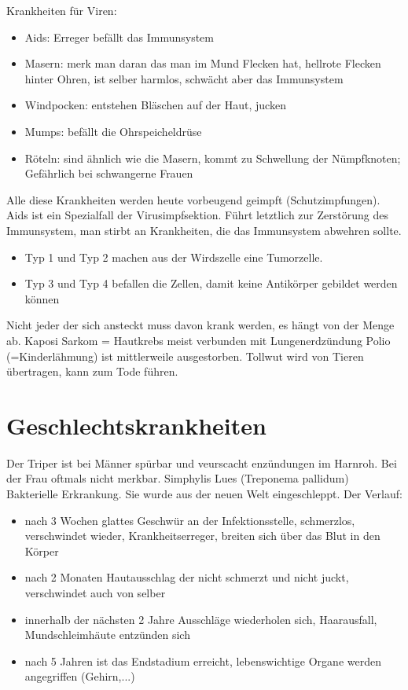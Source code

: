 \documentclass[a4paper]{article}
\begin{document}
Krankheiten für Viren:

\begin{itemize}
\item Aids: Erreger befällt das Immunsystem
\item Masern: merk man daran das man im Mund Flecken hat, hellrote Flecken hinter Ohren, ist selber harmlos, schwächt aber das Immunsystem
\item Windpocken: entstehen Bläschen auf der Haut, jucken
\item Mumps: befällt die Ohrspeicheldrüse
\item Röteln: sind ähnlich wie die Masern, kommt zu Schwellung der Nümpfknoten; Gefährlich bei schwangerne Frauen

\end{itemize}

Alle diese Krankheiten werden heute vorbeugend geimpft (Schutzimpfungen). Aids ist ein Spezialfall der Virusimpfsektion. Führt letztlich zur Zerstörung des Immunsystem, man stirbt an Krankheiten, die das Immunsystem abwehren sollte.

\begin{itemize}
\item Typ 1 und Typ 2 machen aus der Wirdszelle eine Tumorzelle.
\item Typ 3 und Typ 4 befallen die Zellen, damit keine Antikörper gebildet werden können
\end{itemize}

Nicht jeder der sich ansteckt muss davon krank werden, es hängt von der Menge ab. Kaposi Sarkom = Hautkrebs meist verbunden mit Lungenerdzündung Polio (=Kinderlähmung) ist mittlerweile ausgestorben. Tollwut wird von Tieren übertragen, kann zum Tode führen.

\section{Geschlechtskrankheiten}
Der Triper ist bei Männer spürbar und veurscacht enzündungen im Harnroh. Bei der Frau oftmals nicht merkbar.
Simphylis Lues (Treponema pallidum) Bakterielle Erkrankung. Sie wurde aus der neuen Welt eingeschleppt. 
\nextline
Der Verlauf:

\begin{itemize}
\item nach 3 Wochen glattes Geschwür an der Infektionsstelle, schmerzlos, verschwindet wieder, Krankheitserreger, breiten sich über das Blut in den Körper 
\item nach 2 Monaten Hautausschlag der nicht schmerzt und nicht juckt, verschwindet auch von selber
\item innerhalb der nächsten 2 Jahre Ausschläge wiederholen sich, Haarausfall, Mundschleimhäute entzünden sich
\item nach 5 Jahren ist das Endstadium erreicht, lebenswichtige Organe werden angegriffen (Gehirn,...)
\end{itemize}
\end{document}
